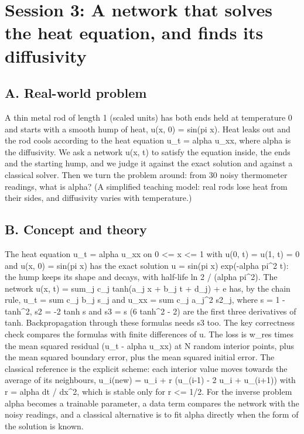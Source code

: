 \documentclass[11pt,a4paper]{article}
\begin{document}
\section{Session 3: A network that solves the heat equation, and finds its diffusivity}

\subsection*{A. Real-world problem}
A thin metal rod of length 1 (scaled units) has both ends held at temperature 0 and starts with a smooth hump of heat, u(x, 0) = sin(pi x). Heat leaks out and the rod cools according to the heat equation u\_t = alpha u\_xx, where alpha is the diffusivity. We ask a network u(x, t) to satisfy the equation inside, the ends and the starting hump, and we judge it against the exact solution and against a classical solver. Then we turn the problem around: from 30 noisy thermometer readings, what is alpha? (A simplified teaching model: real rods lose heat from their sides, and diffusivity varies with temperature.)

\subsection*{B. Concept and theory}
The heat equation u\_t = alpha u\_xx on 0 \textless{}= x \textless{}= 1 with u(0, t) = u(1, t) = 0 and u(x, 0) = sin(pi x) has the exact solution u = sin(pi x) exp(-alpha pi\textasciicircum{}2 t): the hump keeps its shape and decays, with half-life ln 2 / (alpha pi\textasciicircum{}2). The network u(x, t) = sum\_j c\_j tanh(a\_j x + b\_j t + d\_j) + e has, by the chain rule, u\_t = sum c\_j b\_j s\_j and u\_xx = sum c\_j a\_j\textasciicircum{}2 s2\_j, where s = 1 - tanh\textasciicircum{}2, s2 = -2 tanh s and s3 = s (6 tanh\textasciicircum{}2 - 2) are the first three derivatives of tanh. Backpropagation through these formulas needs s3 too. The key correctness check compares the formulas with finite differences of u. The loss is w\_res times the mean squared residual (u\_t - alpha u\_xx) at N random interior points, plus the mean squared boundary error, plus the mean squared initial error. The classical reference is the explicit scheme: each interior value moves towards the average of its neighbours, u\_i(new) = u\_i + r (u\_(i-1) - 2 u\_i + u\_(i+1)) with r = alpha dt / dx\textasciicircum{}2, which is stable only for r \textless{}= 1/2. For the inverse problem alpha becomes a trainable parameter, a data term compares the network with the noisy readings, and a classical alternative is to fit alpha directly when the form of the solution is known.
\end{document}

